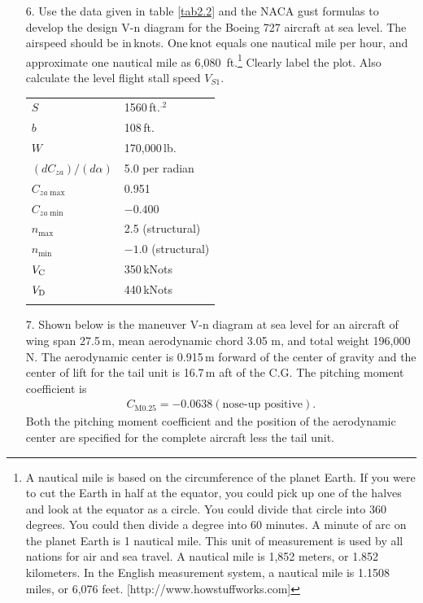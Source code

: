\documentclass{AeroStructure-ERJohnson}
\begin{document}
\begin{enumerate}
\item[6.] Use the data given in table \ref{tab2.2} and the NACA gust formulas to develop the design V-n diagram for the Boeing 727 aircraft at sea level. The airspeed should be in\,knots. One\,knot equals one nautical mile per hour, and approximate one nautical mile as 6,080~ft.\footnote{A nautical mile is based on the circumference of the planet Earth. If you were to cut the Earth in half at the equator, you could pick up one of the halves and look at the equator as a circle. You could divide that circle into 360 degrees. You could then divide a degree into 60 minutes. A minute of arc on the planet Earth is 1 nautical mile. This unit of measurement is used by all nations for air and sea travel. A nautical mile is 1,852 meters, or 1.852 kilometers. In the English measurement system, a nautical mile is 1.1508 miles, or 6,076 feet. [http://www.howstuffworks.com]}  Clearly label the plot. Also calculate the level flight stall speed $V_{S 1}$.


\begin{table}[!h]
{\begin{tabular}{@{}ll}\toprule
$S$	& 1560\,ft.$^{.2}$\\
$b$	& 108\,ft.\\
$W$	& 170,000\,lb.\\
$(d C_{z a})/(d \alpha)$	& 5.0 per radian\\
$C_{z a \max}$ & 0.951\\
$C_{z a \min}$ & $-0.400$\\
$n_{\max}$	& 2.5 (structural)\\
$n_{\min}$	& $-1.0$ (structural)\\
$V_{\rm C}$ & 350\,kNots\\
$V_{\rm D}$ & 440\,kNots\\\botrule
\end{tabular}}{\vspace*{-60pt}}
\end{table}

\item[7.] Shown below is the maneuver V-n diagram at sea level for an aircraft of wing span 27.5\,m, mean aerodynamic chord 3.05 m, and total weight 196,000\,N. The aerodynamic center is 0.915\,m forward of the center of gravity and the center of lift for the tail unit is 16.7\,m aft of the C.G. The pitching moment coefficient is
\begin{align*}
C_{\mathrm{M} 0.25}=-0.0638(\text{nose-up positive}).
\end{align*}
Both the pitching moment coefficient and the position of the aerodynamic center are specified for the complete aircraft less the tail unit\vadjust{\vspace*{15pt}\pagebreak}.


\end{enumerate}
\end{document}
